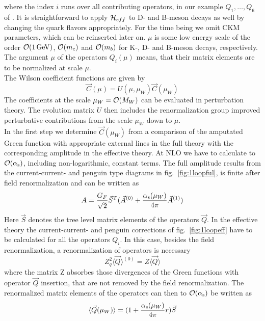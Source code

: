 where the index $i$ runs over all contributing operators, in our
example $Q_1,\ldots, Q_6$ of . It is straightforward to
apply ${\cal H}_{eff}$ to D- and B-meson decays as well by changing
the quark flavors appropriately. For the time being we omit CKM
parameters, which can be reinserted later on. $\mu$ is some low
energy scale of the order ${\cal O}(1\, {\rm GeV})$, ${\cal O}(m_c)$ and ${\cal O}(m_b)$
for K-, D- and B-meson decays, respectively. The argument $\mu$ of the
operators $Q_i(\mu)$ means, that their matrix elements are to be
normalized at scale $\mu$.\\
The Wilson coefficient functions are given by
\begin{equation}\label{cucw}
\vec C(\mu)=U(\mu, \mu_W)\vec C(\mu_W)   \end{equation}
The coefficients at the scale $\mu_W={\cal O}(M_W)$ can be evaluated in
perturbation theory. The evolution matrix $U$ then includes the
renormalization group improved perturbative contributions from the
scale $\mu_W$ down to $\mu$.\\
In the first step we determine $\vec C(\mu_W)$ from a comparison of
the amputated Green function with appropriate external lines in the
full theory with the corresponding amplitude in the effective theory.
At NLO we have to calculate to ${\cal O}(\alpha_{\rm s})$, including
non-logarithmic, constant terms. The full amplitude results from
the current-current- and penguin type diagrams in fig.~\ref{fig:1loopful},
is finite after field renormalization and can be written as
\begin{equation}\label{aa01} A=
{G_F\over\sqrt{2}}\vec S^T(\vec A^{(0)}+{\alpha_{\rm s}(\mu_W)\over 4\pi}\vec A^{(1)})\end{equation}
Here $\vec S$ denotes the tree level matrix elements of the
operators $\vec Q$.
In the effective theory  the current-current- and penguin
corrections of fig.~\ref{fig:1loopeff} have to be calculated for all
the operators $Q_i$. In this case, besides the field renormalization, a
renormalization of operators is necessary
\begin{equation}\label{q0z3}
Z^2_q\langle\vec Q\rangle^{(0)}=Z\langle\vec Q\rangle  \end{equation}
where the matrix Z absorbes those divergences of the Green functions
with operator $\vec Q$ insertion, that are not removed by the field
renormalization. The renormalized matrix elements of the operators
can then to ${\cal O}(\alpha_{\rm s})$ be written as
\begin{equation}\label{qars}
\langle\vec Q(\mu_W)\rangle=(1+{\alpha_{\rm s}(\mu_W)\over 4\pi} r)\vec S  \end{equation}
